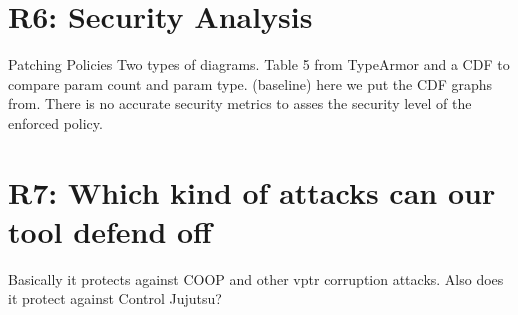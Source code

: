 \section{R6: Security Analysis}
\label{Security Evaluation}

Patching Policies
Two types of diagrams. Table 5 from TypeArmor and a CDF to compare param count and param type. (baseline)
here we put the CDF graphs from. There is no accurate security metrics to asses the security level of the enforced policy.

\section{R7: Which kind of attacks can our tool defend off}
\label{R6: Which kind of attacks can our tool defend off}
Basically it protects against COOP and other vptr corruption attacks.
Also does it protect against Control Jujutsu?




